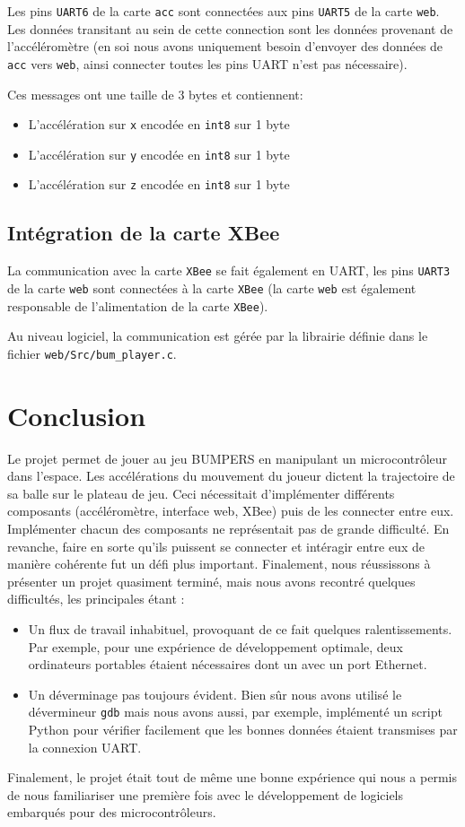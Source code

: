\documentclass[12pt,french]{article}
\begin{document}
Les pins \texttt{UART6} de la carte \texttt{acc} sont connectées aux pins \texttt{UART5} de la carte \texttt{web}. \\

Les données transitant au sein de cette connection sont les données provenant de l'accéléromètre (en soi nous avons uniquement besoin d'envoyer des données de \texttt{acc} vers \texttt{web}, ainsi connecter toutes les pins UART n'est pas nécessaire).

Ces messages ont une taille de 3 bytes et contiennent:

\begin{itemize}
    \item L'accélération sur \texttt{x} encodée en \texttt{int8} sur 1 byte
    \item L'accélération sur \texttt{y} encodée en \texttt{int8} sur 1 byte
    \item L'accélération sur \texttt{z} encodée en \texttt{int8} sur 1 byte
\end{itemize}

\subsection{Intégration de la carte XBee}

La communication avec la carte \texttt{XBee} se fait également en UART, les pins \texttt{UART3} de la carte \texttt{web} sont connectées à la carte \texttt{XBee} (la carte \texttt{web} est également responsable de l'alimentation de la carte \texttt{XBee}).

Au niveau logiciel, la communication est gérée par la librairie définie dans le fichier \texttt{web/Src/bum\_player.c}.


\section{Conclusion}

Le projet permet de jouer au jeu BUMPERS en manipulant un microcontrôleur dans l'espace. Les accélérations du mouvement du joueur dictent la trajectoire de sa balle sur le plateau de jeu. Ceci nécessitait d'implémenter différents composants (accéléromètre, interface web, XBee) puis de les connecter entre eux. Implémenter chacun des composants ne représentait pas de grande difficulté. En revanche, faire en sorte qu'ils puissent se connecter et intéragir entre eux de manière cohérente fut un défi plus important.
Finalement, nous réussissons à présenter un projet quasiment terminé, mais nous avons recontré quelques difficultés, les principales étant :
\begin{itemize}
    \item Un flux de travail inhabituel, provoquant de ce fait quelques ralentissements. Par exemple, pour une expérience de développement optimale, deux ordinateurs portables étaient nécessaires dont un avec un port Ethernet.
    \item Un déverminage pas toujours évident. Bien sûr nous avons utilisé le dévermineur \texttt{gdb} mais nous avons aussi, par exemple, implémenté un script Python pour vérifier facilement que les bonnes données étaient transmises par la connexion UART.
\end{itemize}

Finalement, le projet était tout de même une bonne expérience qui nous a permis de nous familiariser une première fois avec le développement de logiciels embarqués pour des microcontrôleurs.
\end{document}
